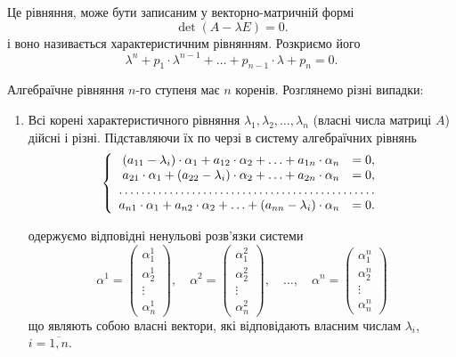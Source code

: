 Це рівняння, може бути записаним у векторно-матричній формі
\begin{equation*}
	\det(A - \lambda E) = 0.
\end{equation*}
і воно називається характеристичним рівнянням. Розкриємо його
\begin{equation*}
	\lambda^n + p_1 \cdot \lambda^{n - 1} + \ldots + p_{n - 1} \cdot \lambda + p_n = 0.
\end{equation*}

Алгебраїчне рівняння $n$-го ступеня має $n$ коренів. Розглянемо різні випадки:
\begin{enumerate}
\item Всі корені характеристичного рівняння $\lambda_1, \lambda_2, \ldots, \lambda_n$ (власні числа матриці $A$) дійсні і різні. Підставляючи їх по черзі в систему алгебраїчних рівнянь
\begin{equation*}
	\left\{
		\begin{array}{rl}
			(a_{11} - \lambda_i) \cdot \alpha_1 + a_{12} \cdot \alpha_2 + \ldots + a_{1n} \cdot \alpha_n &= 0, \\
			a_{21} \cdot \alpha_1 + (a_{22} - \lambda_i) \cdot \alpha_2 + \ldots + a_{2n} \cdot \alpha_n &= 0, \\
			\hdotsfor{2} \\
			a_{n1} \cdot \alpha_1 + a_{n2} \cdot \alpha_2 + \ldots + (a_{nn} - \lambda_i) \cdot \alpha_n &= 0.
		\end{array}
	\right.
\end{equation*}

одержуємо відповідні ненульові розв'язки системи
\begin{equation*}
	\alpha^1 = \begin{pmatrix} \alpha_1^1 \\ \alpha_2^1 \\ \vdots \\ \alpha_n^1 \end{pmatrix}, \quad
	\alpha^2 = \begin{pmatrix} \alpha_1^2 \\ \alpha_2^2 \\ \vdots \\ \alpha_n^2 \end{pmatrix}, \quad
	\ldots, \quad
	\alpha^n = \begin{pmatrix} \alpha_1^n \\ \alpha_2^n \\ \vdots \\ \alpha_n^n \end{pmatrix}
\end{equation*}
що являють собою власні вектори, які відповідають власним числам $\lambda_i$, $i = \overline{1, n}$. \parvskip


\end{enumerate}
